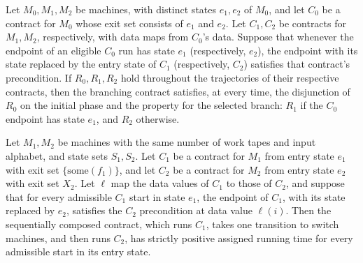\begin{theorem}
\label{Turing.Contract.Traj.branch}
\leanok
{}
Let $M_0,M_1,M_2$ be machines, with distinct states $e_1,e_2$ of $M_0$, and let $C_0$ be
a contract for $M_0$ whose exit set consists of $e_1$ and $e_2$. Let $C_1,C_2$ be
contracts for $M_1,M_2$, respectively, with data maps from $C_0$'s data. Suppose that
whenever the endpoint of an eligible $C_0$ run has state $e_1$ (respectively, $e_2$),
the endpoint with its state replaced by the entry state of $C_1$ (respectively, $C_2$)
satisfies that contract's precondition. If $R_0,R_1,R_2$ hold throughout the
trajectories of their respective contracts, then the branching contract satisfies, at
every time, the disjunction of $R_0$ on the initial phase and the property for the
selected branch: $R_1$ if the $C_0$ endpoint has state $e_1$, and $R_2$ otherwise.
\end{theorem}

\begin{theorem}
\label{Turing.Contract.seq_positive}
\leanok
{}
Let $M_1,M_2$ be machines with the same number of work tapes and input alphabet, and
state sets $S_1,S_2$. Let $C_1$ be a contract for $M_1$ from entry state $e_1$ with exit
set $\{\mathrm{some}(f_1)\}$, and let $C_2$ be a contract for $M_2$ from entry state
$e_2$ with exit set $X_2$. Let $\ell$ map the data values of $C_1$ to those of $C_2$,
and suppose that for every admissible $C_1$ start in state $e_1$, the endpoint of $C_1$,
with its state replaced by $e_2$, satisfies the $C_2$ precondition at data value
$\ell(i)$. Then the sequentially composed contract, which runs $C_1$, takes one
transition to switch machines, and then runs $C_2$, has strictly positive assigned
running time for every admissible start in its entry state.
\end{theorem}

